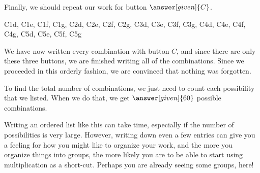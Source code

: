 \documentclass{ximera}
\begin{document}
\begin{example}
Finally, we should repeat our work for button $\answer[given]{C}$.
\begin{center}
C1d, C1e, C1f, C1g, C2d, C2e, C2f, C2g, C3d, C3e, C3f, C3g, C4d, C4e, C4f,  C4g,  C5d,  C5e,  C5f, C5g
\end{center}
We have now written every combination with button $C$, and since there are only these three buttons, we are finished writing all of the combinations. Since we proceeded in this orderly fashion, we are convinced that nothing was forgotten.

To find the total number of combinations, we just need to count each possibility that we listed. When we do that, we get $\answer[given]{60}$ possible combinations.

\end{example}
Writing an ordered list like this can take time, especially if the number of possibilities is very large. However, writing down even a few entries can give you a feeling for how you might like to organize your work, and the more you organize things into groups, the more likely you are to be able to start using multiplication as a short-cut. Perhaps you are already seeing some groups, here!
\end{document}
